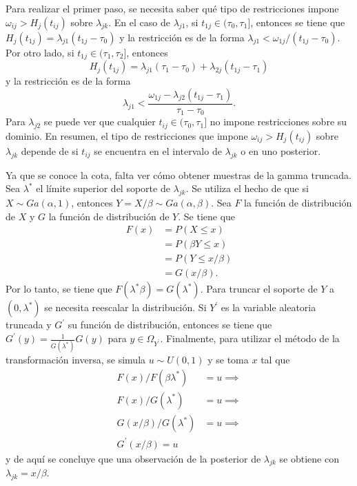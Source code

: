 \documentclass[11pt,a4paper]{article}
\begin{document}
Para realizar el primer paso, se necesita saber qué tipo de restricciones impone $\omega_{ij} > H_j(t_{ij})$ sobre $\lambda_{jk}$. En el caso de $\lambda_{j1}$, si $t_{1j} \in (\tau_0, \tau_1]$, entonces se tiene que $H_j(t_{1j}) = \lambda_{j1}(t_{1j} - \tau_0)$ y la restricción es de la forma $\lambda_{j1} < \omega_{1j} / (t_{1j} - \tau_0)$. Por otro lado, si $t_{1j} \in (\tau_1, \tau_2]$, entonces $$H_j(t_{1j}) = \lambda_{j1}(\tau_1 - \tau_0) + \lambda_{2j}(t_{1j} - \tau_1)$$ y la restricción es de la forma $$\lambda_{j1} < \frac{\omega_{1j}-\lambda_{j2}(t_{1j} - \tau_1)}{\tau_1 - \tau_0}.$$ Para $\lambda_{j2}$ se puede ver que cualquier $t_{ij} \in (\tau_0, \tau_1]$ no impone restricciones sobre su dominio. En resumen, el tipo de restricciones que impone $\omega_{ij} > H_j(t_{ij})$ sobre $\lambda_{jk}$ depende de si $t_{ij}$ se encuentra en el intervalo de $\lambda_{jk}$ o en uno posterior.

Ya que se conoce la cota, falta ver cómo obtener muestras de la gamma truncada. Sea $\lambda^*$ el límite superior del soporte de $\lambda_{jk}$. Se utiliza el hecho de que si $X \sim Ga(\alpha, 1)$, entonces $Y = X/\beta \sim Ga(\alpha, \beta)$. Sea $F$ la función de distribución de $X$ y $G$ la función de distribución de $Y$. Se tiene que
\begin{align*}
F(x) &= P\left( X \leq x\right)\\
&= P\left( \beta Y \leq x \right)\\
&= P\left( Y \leq x/\beta \right)\\
&= G(x/\beta).
\end{align*}
Por lo tanto, se tiene que $F(\lambda^* \beta) = G(\lambda^*)$. Para truncar el soporte de $Y$ a $(0, \lambda^*)$ se necesita reescalar la distribución. Si $Y^\prime$ es la variable aleatoria truncada y $G^\prime$ su función de distribución, entonces se tiene que $G^\prime (y) = \frac{1}{G(\lambda^*)} G(y)$ para $y \in \Omega_{Y^\prime}$. Finalmente, para utilizar el método de la transformación inversa, se simula $u\sim U(0, 1)$ y se toma $x$ tal que
\begin{align*}
F(x) / F(\beta \lambda^*) &= u \implies\\
F(x) / G(\lambda^*) &= u \implies\\
G(x/\beta) / G(\lambda^*) &= u \implies\\
G^\prime (x/\beta) = u
\end{align*}
y de aquí se concluye que una observación de la posterior de $\lambda_{jk}$ se obtiene con $\lambda_{jk} = x/\beta$.
\end{document}
